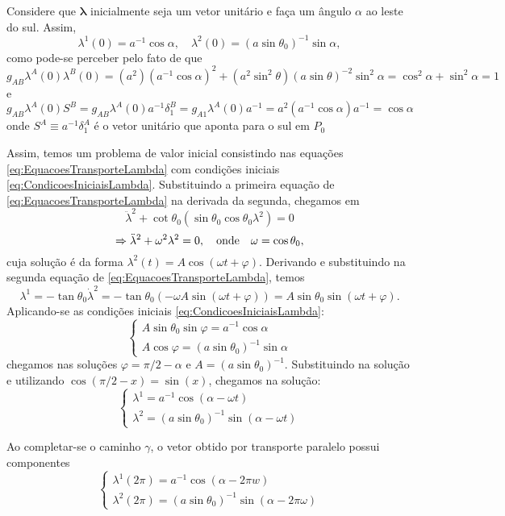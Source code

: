 \begin{exemplo}
Considere que $\boldsymbol{\lambda}$ inicialmente seja um vetor unitário e faça um ângulo $\alpha$ ao leste do sul. Assim,
\begin{equation}\label{eq:CondicoesIniciaisLambda}
	\lambda^{1}(0)=a^{-1} \cos \alpha, \quad \lambda^{2}(0)=\left(a \sin \theta_{0}\right)^{-1} \sin \alpha ,
\end{equation}
como pode-se perceber pelo fato de que
\[
	g_{AB}\lambda^A(0)\lambda^B(0)=(a^2)(a^{-1}\cos\alpha)^2+(a^2\sin^2\theta)(a\sin\theta)^{-2}\sin^2\alpha=\cos^2\alpha+\sin^2\alpha=1
\]
e
\[
	g_{AB}\lambda^A(0)S^B = g_{AB}\lambda^A(0)a^{-1}\delta^B_1=g_{A1}\lambda^A(0)a^{-1}=a^2(a^{-1}\cos\alpha)a^{-1}=\cos\alpha
\]
onde $S^A\equiv a^{-1}\delta^A_1$ é o vetor unitário que aponta para o sul em $P_0$

Assim, temos um problema de valor inicial consistindo nas equações \eqref{eq:EquacoesTransporteLambda} com condições iniciais \eqref{eq:CondicoesIniciaisLambda}. Substituindo a primeira equação de \eqref{eq:EquacoesTransporteLambda} na derivada da segunda, chegamos em
\[
\ddot{\lambda}^2+\cot\theta_0(\sin\theta_0\cos\theta_0\lambda^2)=0	
\]
\[
\Rightarrow \ddot{\lambda}^2+\omega^2\lambda^2=0, \qq{onde} \omega=\cos\theta_0,
\]
cuja solução é da forma $\lambda^2(t)=A\cos(\omega t+\varphi)$. Derivando e substituindo na segunda equação de \eqref{eq:EquacoesTransporteLambda}, temos
\[
\lambda^1=-\tan\theta_0\dot{\lambda}^2=-\tan\theta_0(-\omega A\sin(\omega t+\varphi))	= A\sin\theta_0\sin(\omega t+\varphi).
\]
Aplicando-se as condições iniciais \eqref{eq:CondicoesIniciaisLambda}:
\[
\left\{\begin{array}{l}
{A\sin\theta_0\sin\varphi=a^{-1}\cos\alpha} \\ 
{A\cos\varphi=(a\sin\theta_0)^{-1}\sin\alpha}
\end{array}\right.	
\]
chegamos nas soluções $\varphi=\pi/2-\alpha$ e $A=(a\sin\theta_0)^{-1}$. Substituindo na solução e utilizando $\cos(\pi/2-x)=\sin(x)$, chegamos na solução:
\begin{equation}\label{eq:SolucaoTransporteLambda}
	\left\{\begin{array}{l}
	{\lambda^{1}=a^{-1} \cos (\alpha-\omega t)} \\ 
	{\lambda^{2}=\left(a \sin \theta_{0}\right)^{-1} \sin (\alpha-\omega t)}
	\end{array}\right.
\end{equation}

Ao completar-se o caminho $\gamma$, o vetor obtido por transporte paralelo possui componentes
\[
\left\{\begin{array}{l}{\lambda^{1}(2 \pi)=a^{-1} \cos (\alpha-2 \pi w)} \\ {\lambda^{2}(2 \pi)=\left(a \sin \theta_{0}\right)^{-1} \sin (\alpha-2 \pi \omega)}\end{array}\right.
\]


\end{exemplo}
